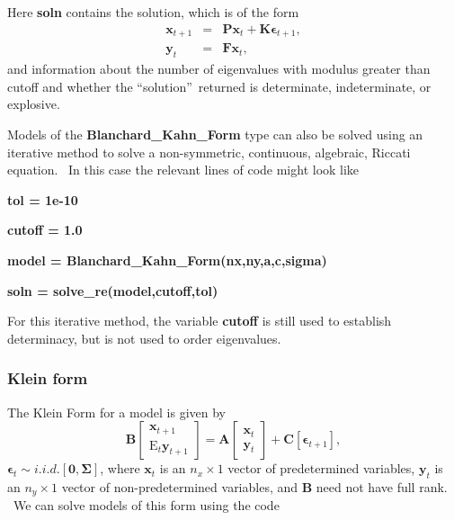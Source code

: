 \documentclass[thmsa,notitlepage,11pt]{article}
\begin{document}
\bigskip

Here \textbf{soln} contains the solution, which is of the form%
\begin{eqnarray*}
\mathbf{x}_{t+1} &=&\mathbf{Px}_{t}+\mathbf{K\epsilon }_{t+1}, \\
\mathbf{y}_{t} &=&\mathbf{Fx}_{t},
\end{eqnarray*}%
and information about the number of eigenvalues with modulus greater than
cutoff and whether the \textquotedblleft solution\textquotedblright\
returned is determinate, indeterminate, or explosive.

Models of the \textbf{Blanchard\_Kahn\_Form} type can also be solved using
an iterative method to solve a non-symmetric, continuous, algebraic, Riccati
equation. \ In this case the relevant lines of code might look like

\bigskip

\textbf{tol = 1e-10}

\textbf{cutoff = 1.0}

\textbf{model = Blanchard\_Kahn\_Form(nx,ny,a,c,sigma)}

\textbf{soln = solve\_re(model,cutoff,tol)}

\bigskip

For this iterative method, the variable \textbf{cutoff} is still used to
establish determinacy, but is not used to order eigenvalues.

\subsubsection{Klein form}

The Klein Form for a model is given by%
\[
\mathbf{B}\left[ 
\begin{array}{c}
\mathbf{x}_{t+1} \\ 
\text{E}_{t}\mathbf{y}_{t+1}%
\end{array}%
\right] =\mathbf{A}\left[ 
\begin{array}{c}
\mathbf{x}_{t} \\ 
\mathbf{y}_{t}%
\end{array}%
\right] +\mathbf{C}\left[ \mathbf{\epsilon }_{t+1}\right] , 
\]%
$\mathbf{\epsilon }_{t}\sim i.i.d.[\mathbf{0},\mathbf{\Sigma }]$, where $%
\mathbf{x}_{t}$ is an $n_{x}\times 1$ vector of predetermined variables, $%
\mathbf{y}_{t}$ is an $n_{y}\times 1$ vector of non-predetermined variables,
and $\mathbf{B}$ need not have full rank. \ We can solve models of this form
using the code

\bigskip
\end{document}
